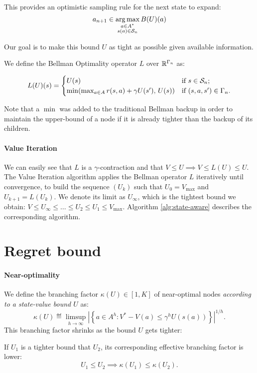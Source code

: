 \documentclass{article}
\begin{document}
This provides an optimistic sampling rule for the next state to expand:
\begin{equation}
    \label{eq:sampling_rule}
    a_{n+1} \in \operatorname*{arg\,max}_{\substack{a\in A^*\\s(a)\in\mathcal{S}_n}} B(U)(a)
\end{equation}

Our goal is to make this bound $U$ as tight as possible given available information.

\begin{definition}
We define the Bellman Optimality operator $L$ over $\mathbb{R}^{\Gamma_n}$ as:

\begin{equation}
    L(U)(s) = \begin{cases}
    U(s) & \text{if $s\in\mathcal{S}_n$;} \\
    \min(\max_{a\in A} r(s,a) + \gamma U({s'}),\, U(s))
    & \text{if $(s,a,s')\in\Gamma_n$.}
    \end{cases}
\end{equation}

Note that a $\min$ was added to the traditional Bellman backup in order to maintain the upper-bound of a node if it is already  tighter than the backup of its children.
\end{definition}

\paragraph{Value Iteration}
We can easily see that $L$ is a $\gamma$-contraction and that
$
    V \leq U \implies V \leq L(U) \leq U.
$
The Value Iteration algorithm applies the Bellman operator $L$ iteratively until convergence, to build the sequence $(U_k)$ such that $U_0 = V_{\max}$ and $U_{k+1} = L(U_k)$. We denote its limit as $U_\infty$, which is the tightest bound we obtain: $V\leq U_\infty\leq\dots\leq U_2 \leq U_1\leq V_{\max}$.
Algorithm \ref{alg:state-aware} describes the corresponding algorithm.


\section{Regret bound}

\paragraph{Near-optimality}

We define the branching factor $\kappa(U)\in[1, K]$ of near-optimal nodes \emph{according to a state-value bound $U$} as:
\begin{equation}
    \kappa(U) \eqdef \limsup_{h\rightarrow\infty} \left|\left\{a\in A^h: V^* - V(a)\leq \gamma^{h}U(s(a))\right\}\right|^{1/h}.
\end{equation}
This branching factor shrinks as the bound $U$ gets tighter:
\begin{lemma}
If $U_1$ is a tighter bound that $U_2$, its corresponding effective branching factor is lower:
\[U_1\leq U_2\implies \kappa(U_1) \leq \kappa(U_2).\]
\end{lemma}
\end{document}
